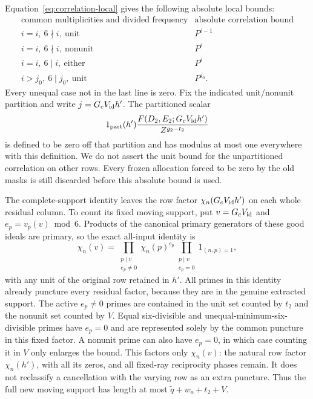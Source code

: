 \documentclass[12pt]{article}
\begin{document}
Equation~\eqref{eq:correlation-local} gives the following absolute
local bounds:
\[
 \begin{array}{c|c}
 \text{common multiplicities and divided frequency}&
       \text{absolute correlation bound}\\ \hline
 i=i,\ 6\nmid i,\ \text{unit}&P^{i-1}\\
 i=i,\ 6\nmid i,\ \text{nonunit}&P^i\\
 i=i,\ 6\mid i,\ \text{either}&P^i\\
 i>j_0,\ 6\mid j_0,\ \text{unit}&P^{j_0}.
 \end{array}
\]
Every unequal case not in the last line is zero.  Fix the indicated
unit/nonunit partition and write \(j=G_cV_{\rm id}h'\).  The
partitioned scalar
\[
 1_{\rm part}(h')
 \frac{F(D_2,E_2;G_cV_{\rm id}h')}{Z^{g_2-t_2}}
\]
is defined to be zero off that partition and has modulus at most one
everywhere with this definition.  We do not assert the unit bound for
the unpartitioned correlation on other rows.  Every frozen allocation
forced to be zero by the old masks is still discarded before this
absolute bound is used.

The complete-support identity leaves the row factor
\(\chi_n(G_cV_{\rm id}h')\) on each whole residual column.
To count its fixed moving support, put \(v=G_cV_{\rm id}\) and
\(e_p=v_p(v)\bmod 6\).  Products of the canonical primary
generators of these good ideals are primary, so the exact all-input
identity is
\[
 \chi_n(v)=
   \prod_{\substack{p\mid v\\e_p\ne0}}\chi_n(p)^{e_p}
   \prod_{\substack{p\mid v\\e_p=0}}1_{(n,p)=1},
\]
with any unit of the original row retained in \(h'\).  All primes in this identity
already puncture every residual factor, because they are in the
genuine extracted support.  The active \(e_p\ne0\) primes are
contained in the unit set counted by \(t_2\) and the nonunit set
counted by \(V\).  Equal six-divisible and unequal-minimum-six-divisible
primes have \(e_p=0\) and are represented solely by the common
puncture in this fixed factor.  A nonunit prime can also have
\(e_p=0\), in which case counting it in \(V\) only enlarges the
bound.  This factors only \(\chi_n(v)\): the natural row factor
\(\chi_n(h')\), with all its zeros, and all fixed-ray reciprocity
phases remain.  It does not reclassify a cancellation with the
varying row as an extra puncture.  Thus the full new moving support
has length at most \(\widetilde q+w_o+t_2+V\).
\end{document}
